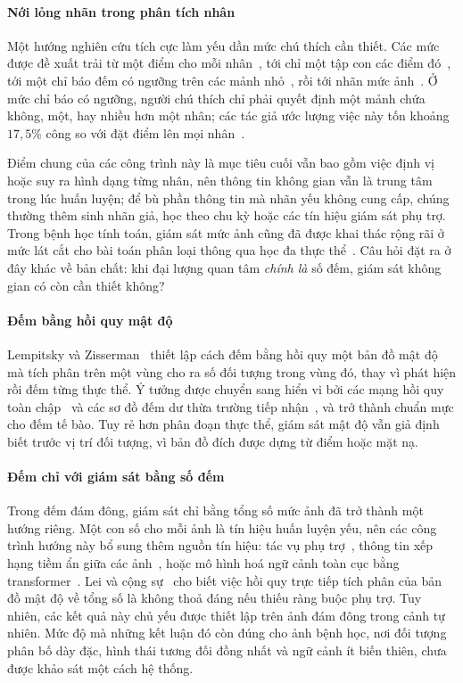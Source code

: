 \documentclass[preprint,12pt]{elsarticle}
\begin{document}
\paragraph{Nới lỏng nhãn trong phân tích nhân} Một hướng nghiên cứu tích cực làm yếu dần mức chú thích cần
thiết. Các mức được đề xuất trải từ một điểm cho mỗi nhân~\cite{pseudoedgenet}, tới chỉ một tập con các điểm
đó~\cite{qu2020}, tới một chỉ báo đếm có ngưỡng trên các mảnh nhỏ~\cite{lirnet}, rồi tới nhãn mức
ảnh~\cite{cyclic}. Ở mức chỉ báo có ngưỡng, người chú thích chỉ phải quyết định một mảnh chứa không, một, hay
nhiều hơn một nhân; các tác giả ước lượng việc này tốn khoảng $17{,}5\%$ công so với đặt điểm lên mọi
nhân~\cite{lirnet}.

Điểm chung của các công trình này là mục tiêu cuối vẫn bao gồm việc định vị hoặc suy ra hình dạng từng nhân, nên
thông tin không gian vẫn là trung tâm trong lúc huấn luyện; để bù phần thông tin mà nhãn yếu không cung cấp, chúng
thường thêm sinh nhãn giả, học theo chu kỳ hoặc các tín hiệu giám sát phụ trợ. Trong bệnh học tính toán, giám sát
mức ảnh cũng đã được khai thác rộng rãi ở mức lát cắt cho bài toán phân loại thông qua học đa thực
thể~\cite{campanella}. Câu hỏi đặt ra ở đây khác về bản chất: khi đại lượng quan tâm \emph{chính là} số đếm, giám
sát không gian có còn cần thiết không?

\paragraph{Đếm bằng hồi quy mật độ} Lempitsky và Zisserman~\cite{lempitsky} thiết lập cách đếm bằng hồi quy một
bản đồ mật độ mà tích phân trên một vùng cho ra số đối tượng trong vùng đó, thay vì phát hiện rồi đếm từng thực
thể. Ý tưởng được chuyển sang hiển vi bởi các mạng hồi quy toàn chập~\cite{fcrn} và các sơ đồ đếm dư thừa trường
tiếp nhận~\cite{countception}, và trở thành chuẩn mực cho đếm tế bào. Tuy rẻ hơn phân đoạn thực thể, giám sát mật
độ vẫn giả định biết trước vị trí đối tượng, vì bản đồ đích được dựng từ điểm hoặc mặt nạ.

\paragraph{Đếm chỉ với giám sát bằng số đếm} Trong đếm đám đông, giám sát chỉ bằng tổng số mức ảnh đã trở thành
một hướng riêng. Một con số cho mỗi ảnh là tín hiệu huấn luyện yếu, nên các công trình hướng này bổ sung thêm
nguồn tín hiệu: tác vụ phụ trợ~\cite{matt}, thông tin xếp hạng tiềm ẩn giữa các ảnh~\cite{sorting}, hoặc mô hình
hoá ngữ cảnh toàn cục bằng transformer~\cite{transcrowd}. Lei và cộng sự~\cite{matt} cho biết việc hồi quy trực
tiếp tích phân của bản đồ mật độ về tổng số là không thoả đáng nếu thiếu ràng buộc phụ trợ. Tuy nhiên, các kết quả
này chủ yếu được thiết lập trên ảnh đám đông trong cảnh tự nhiên. Mức độ mà những kết luận đó còn đúng cho ảnh
bệnh học, nơi đối tượng phân bố dày đặc, hình thái tương đối đồng nhất và ngữ cảnh ít biến thiên, chưa được khảo
sát một cách hệ thống.
\end{document}
